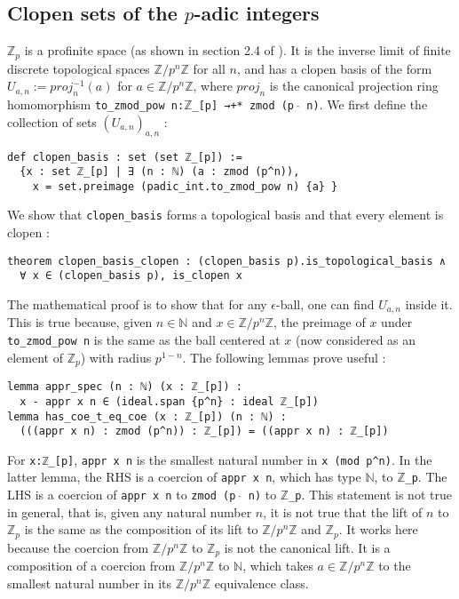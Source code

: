 \documentclass[a4paper,UKenglish,cleveref, autoref, thm-restate]{lipics-v2021}
\newcommand{\lean}[1]{\texttt{#1}\xspace} %
\begin{document}
\subsection{Clopen sets of the $p$-adic integers}
$\mathbb{Z}_p$ is a profinite space (as shown in section 2.4 of \cite{witt}). It is the inverse limit of finite
discrete topological spaces $\mathbb{Z}/p^n \mathbb{Z}$ for all $n$, and has a clopen basis of the
form $U_{a,n} := proj_n ^{-1} (a)$ for $a \in \mathbb{Z}/p^n \mathbb{Z}$, where $proj_n$ is the
canonical projection ring homomorphism \lean{to\_zmod\_pow n:$\mathbb{Z}$\_[p] →+* zmod (p $\hat{}$ n)}. 
We first define the collection of sets $(U_{a,n})_{a,n}$ :
\begin{lstlisting}
def clopen_basis : set (set ℤ_[p]) := 
  {x : set ℤ_[p] | ∃ (n : ℕ) (a : zmod (p^n)), 
    x = set.preimage (padic_int.to_zmod_pow n) {a} }
\end{lstlisting}
We show that \lean{clopen\_basis} forms a topological basis and that every element is
clopen :
\begin{lstlisting}
theorem clopen_basis_clopen : (clopen_basis p).is_topological_basis ∧ 
  ∀ x ∈ (clopen_basis p), is_clopen x
\end{lstlisting}
The mathematical proof is to show that for any $\epsilon$-ball, one can find $U_{a,n}$ inside it.
This is true because, given $n \in \mathbb{N}$ and $x \in \mathbb{Z} / p^n \mathbb{Z}$, the preimage of $x$ 
under \lean{to\_zmod\_pow n} is the same as the ball centered at $x$ (now considered as an element of $\mathbb{Z}_p$) with radius $p^{1 - n}$. 
The following lemmas prove useful :
\begin{lstlisting}
lemma appr_spec (n : ℕ) (x : ℤ_[p]) : 
  x - appr x n ∈ (ideal.span {p^n} : ideal ℤ_[p])
lemma has_coe_t_eq_coe (x : ℤ_[p]) (n : ℕ) : 
  (((appr x n) : zmod (p^n)) : ℤ_[p]) = ((appr x n) : ℤ_[p])
\end{lstlisting}
For \lean{x:ℤ\_[p]}, \lean{appr x n} is the smallest natural number in \lean{x (mod p\textasciicircum n)}. 
In the latter lemma, the RHS is a coercion of \lean{appr x n}, which has type \lean{$\mathbb{N}$}, to \lean{$\mathbb{Z}$\_p}. 
The LHS is a coercion of \lean{appr x n} to \lean{zmod (p $\hat{}$ n)} to \lean{$\mathbb{Z}$\_p}. 
This statement is not true in general, that is, given any natural number $n$, it is not true that the lift of $n$ to $\mathbb{Z}_p$ 
is the same as the composition of its lift to $\mathbb{Z}/p^n \mathbb{Z}$ and $\mathbb{Z}_p$. 
It works here because the coercion from $\mathbb{Z}/p^n \mathbb{Z}$ to $\mathbb{Z}_p$ is not the canonical lift.
It is a composition of a coercion from $\mathbb{Z}/p^n \mathbb{Z}$ to $\mathbb{N}$, which takes
$a \in \mathbb{Z}/p^n \mathbb{Z}$ to the smallest natural number in its
$\mathbb{Z}/p^n \mathbb{Z}$ equivalence class. 
\end{document}
